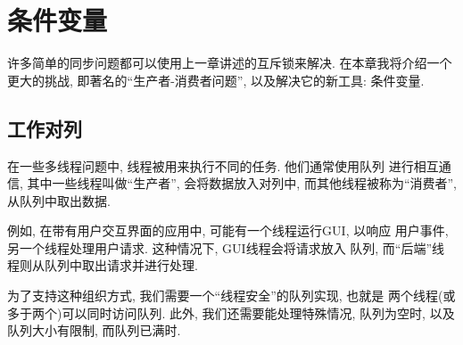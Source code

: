 \documentclass[12pt]{book}
\begin{document}
{\chapter{条件变量}
\label{csem}

许多简单的同步问题都可以使用上一章讲述的互斥锁来解决.
在本章我将介绍一个更大的挑战, 即著名的``生产者-消费者问题'', 
以及解决它的新工具: 条件变量.

\section{工作对列}
\label{queue}

在一些多线程问题中, 线程被用来执行不同的任务. 他们通常使用队列
进行相互通信, 其中一些线程叫做``生产者'', 会将数据放入对列中, 
而其他线程被称为``消费者'', 从队列中取出数据.

例如, 在带有用户交互界面的应用中, 可能有一个线程运行GUI, 以响应
用户事件, 另一个线程处理用户请求. 这种情况下, GUI线程会将请求放入
队列, 而``后端''线程则从队列中取出请求并进行处理.

为了支持这种组织方式, 我们需要一个``线程安全''的队列实现, 也就是
两个线程(或多于两个)可以同时访问队列. 此外, 我们还需要能处理特殊情况,  
队列为空时, 以及队列大小有限制, 而队列已满时.

}
\end{document}

